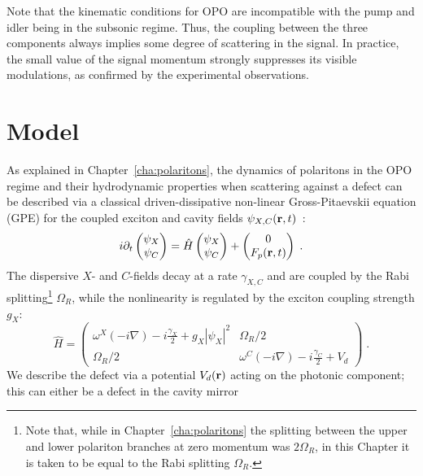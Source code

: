 Note that the kinematic conditions for OPO are incompatible with the
pump and idler being in the subsonic regime. Thus, the coupling
between the three components always implies some degree of scattering
in the signal. In practice, the small value of the signal momentum
strongly suppresses its visible modulations, as confirmed by the
experimental observations.

\section{Model}
\label{sec:model-opo}

As explained in Chapter~\ref{cha:polaritons}, the dynamics of
polaritons in the OPO regime and their hydrodynamic properties when
scattering against a defect can be described via a classical
driven-dissipative non-linear Gross-Pitaevskii equation (GPE) for the
coupled exciton and cavity fields
$\psi_{X,C} (\mathbf{r},t)$~\cite{Whittaker_2005,Carusotto_2013}:
%
\begin{equation}
  i\partial_t \begin{pmatrix} \psi_X \\ \psi_C \end{pmatrix} =
  \hat{H} \begin{pmatrix} \psi_X \\ \psi_C \end{pmatrix}
  + \begin{pmatrix} 0 \\ F_p(\mathbf{r},t) \end{pmatrix} \; .
\label{eq:gpequ}
\end{equation}
%
The dispersive $X$- and $C$-fields decay at a rate $\gamma_{X,C}$ and
are coupled by the Rabi splitting\footnote{Note that, while in
  Chapter~\ref{cha:polaritons} the splitting between the upper and
  lower polariton branches at zero momentum was $2\Omega_R$, in this
  Chapter it is taken to be equal to the Rabi splitting $\Omega_R$.}
$\Omega_R$, while the nonlinearity is regulated by the exciton
coupling strength $g_X$:
%
\begin{equation}
  \hat{H} = \begin{pmatrix} \omega^{X}(-i\nabla) - i
    \frac{\gamma_X}{2} + g_X |\psi_X|^2 & \Omega_R/2 \\ \Omega_R/2 &
    \omega^C(-i\nabla) - i \frac{\gamma_C}{2} + V_d \end{pmatrix} \;
  .
\end{equation}
%
We describe the defect via a potential $V_d (\mathbf{r})$ acting on the
photonic component; this can either be a defect in the cavity mirror
